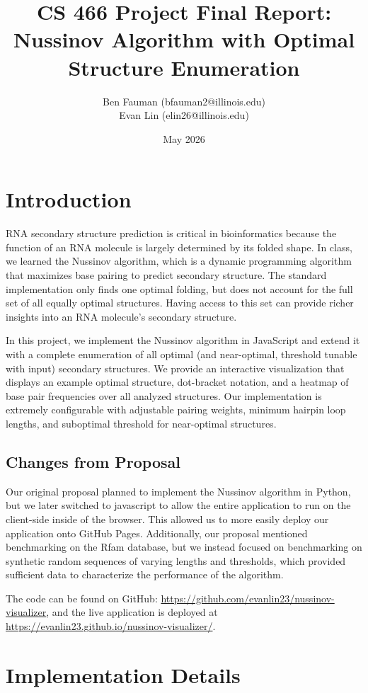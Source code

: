 \documentclass[12pt]{article}
\title{CS 466 Project Final Report:\\Nussinov Algorithm with Optimal Structure Enumeration}
\author{Ben Fauman (bfauman2@illinois.edu)\\ Evan Lin (elin26@illinois.edu)}
\date{May 2026}
\begin{document}
\maketitle

\section{Introduction}
RNA secondary structure prediction is critical in bioinformatics because the function of an RNA molecule is largely determined by its folded shape. In class, we learned the Nussinov algorithm, which is a dynamic programming algorithm that maximizes base pairing to predict secondary structure. The standard implementation only finds one optimal folding, but does not account for the full set of all equally optimal structures. Having access to this set can provide richer insights into an RNA molecule's secondary structure.

In this project, we implement the Nussinov algorithm in JavaScript and extend it with a complete enumeration of all optimal (and near-optimal, threshold tunable with input) secondary structures. We provide an interactive visualization that displays an example optimal structure, dot-bracket notation, and a heatmap of base pair frequencies over all analyzed structures. Our implementation is extremely configurable with adjustable pairing weights, minimum hairpin loop lengths, and suboptimal threshold for near-optimal structures. 

\subsection{Changes from Proposal}
Our original proposal planned to implement the Nussinov algorithm in Python, but we later switched to javascript to allow the entire application to run on the client-side inside of the browser. This allowed us to more easily deploy our application onto GitHub Pages. Additionally, our proposal mentioned benchmarking on the Rfam database, but we instead focused on benchmarking on synthetic random sequences of varying lengths and thresholds, which provided sufficient data to characterize the performance of the algorithm.

The code can be found on GitHub: \url{https://github.com/evanlin23/nussinov-visualizer}, and the live application is deployed at \url{https://evanlin23.github.io/nussinov-visualizer/}.

\section{Implementation Details}
\end{document}

